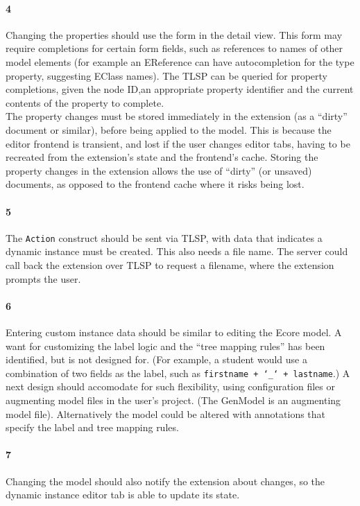 \paragraph{4} Changing the properties should use the form in the detail view.
This form may require completions for certain form fields, such as references to names of other model elements (for example an EReference can have autocompletion for the type property, suggesting EClass names).
The \acrshort{TLSP} can be queried for property completions, given the node ID,an appropriate property identifier and the current contents of the property to complete.\\

The property changes must be stored immediately in the extension (as a ``dirty'' document or similar), before being applied to the model.
This is because the editor frontend is transient, and lost if the user changes editor tabs, having to be recreated from the extension's state and the frontend's cache.
Storing the property changes in the extension allows the use of ``dirty'' (or unsaved) documents, as opposed to the frontend cache where it risks being lost.

\paragraph{5} The \texttt{Action} construct should be sent via \acrshort{TLSP}, with data that indicates a dynamic instance must be created.
This also needs a file name.
The server could call back the extension over \acrshort{TLSP} to request a filename, where the extension prompts the user.

\paragraph{6} Entering custom instance data should be similar to editing the \gls{Ecore} model.
A want for customizing the label logic and the ``tree mapping rules'' has been identified, but is not designed for.
(For example, a student would use a combination of two fields as the label, such as \texttt{firstname + `\_` + lastname}.)
A next design should accomodate for such flexibility, using configuration files or augmenting model files in the user's project.
(The GenModel is an augmenting model file).
Alternatively the model could be altered with annotations that specify the label and tree mapping rules.

\paragraph{7} Changing the model should also notify the extension about changes, so the dynamic instance editor tab is able to update its state.

